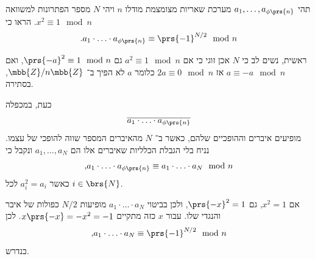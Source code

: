 \documentclass[a4paper,10pt,twoside,openany]{book}
\begin{document}
\begin{exercisechap}
תהי
$a_1, \ldots, a_{\phi\prs{n}}$
מערכת שאריות מצומצמת מודלו
$n$
ויהי
$N$
מספר הפתרונות למשוואה
$x^2 \equiv 1 \mod{n}$.
הראו כי
\[\text{.} a_1 \cdot \ldots \cdot a_{\phi\prs{n}} \equiv \prs{-1}^{N/2} \mod{n}\]
\end{exercisechap}

\begin{solution}
ראשית, נשים לב כי
$N$
אכן זוגי כי אם
$a^2 \equiv 1 \mod{n}$
גם
$\prs{-a}^2 \equiv 1 \mod{n}$,
ואם
$a \equiv -a \mod{n}$
אז
$2a \equiv 0 \mod{n}$
כלומר
$a$
לא הפיך ב־%
$\mbb{Z} / n\mbb{Z}$,
בסתירה.

כעת, במכפלה
\[\overline{a_1 \cdot \ldots \cdot a_{\phi\prs{n}}}\]
מופיעים איברים וההופכיים שלהם, כאשר ב־%
$N$
מהאיברים המספר שווה להופכי של עצמו.
נניח בלי הגבלת הכלליות שאיברים אלו הם
$a_1, \ldots, a_N$
ונקבל כי
\[\text{,} a_1 \cdot \ldots \cdot a_{\phi\prs{n}} \equiv a_1 \cdot \ldots \cdot a_N \mod{n}\]
כאשר
$a_i^2 = a_i$
לכל
$i \in \brs{N}$.

אם
$x^2 = 1$,
גם
$\prs{-x}^2 = 1$,
ולכן בביטוי
$a_1 \cdot \ldots \cdot a_N$
מופיעות
$N/2$
כפולות של איבר והנגדי שלו.
עבור
$x$
כזה מתקיים
$x \prs{-x} = -x^2 = -1$.
לכן
\[\text{,} a_1 \cdot \ldots \cdot a_N \equiv \prs{-1}^{N/2} \mod{n}\]
כנדרש.
\end{solution}

\printbibliography
\end{document}
